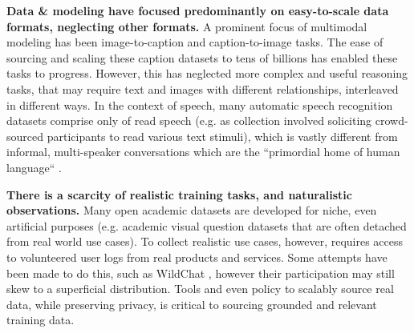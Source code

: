 \textbf{Data \& modeling have focused predominantly on easy-to-scale data formats, neglecting other formats.}
A prominent focus of multimodal modeling has been image-to-caption and caption-to-image tasks.
The ease of sourcing and scaling these caption datasets to tens of billions has enabled these tasks to progress.
However, this has neglected more complex and useful reasoning tasks, that may require text and images with different relationships, interleaved in different ways.
In the context of speech, many automatic speech recognition datasets comprise only of read speech (e.g. as collection involved soliciting crowd-sourced participants to read various text stimuli), which is vastly different from informal, multi-speaker conversations which are the ``primordial home of human language`` \citep{dingemanse2022text}.

\textbf{There is a scarcity of realistic training tasks, and naturalistic observations.}
Many open academic datasets are developed for niche, even artificial purposes (e.g. academic visual question datasets that are often detached from real world use cases).
To collect realistic use cases, however, requires access to volunteered user logs from real products and services.
Some attempts have been made to do this, such as WildChat \citep{zhao2023inthe}, however their participation may still skew to a superficial distribution.
Tools and even policy to scalably source real data, while preserving privacy, is critical to sourcing grounded and relevant training data.

